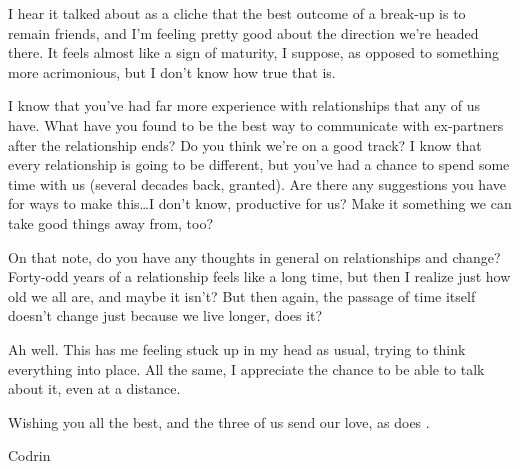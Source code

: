 I hear it talked about as a cliche that the best outcome of a break-up is to remain friends, and I'm feeling pretty good about the direction we're headed there. It feels almost like a sign of maturity, I suppose, as opposed to something more acrimonious, but I don't know how true that is.

I know that you've had far more experience with relationships that any of us have. What have you found to be the best way to communicate with ex-partners after the relationship ends? Do you think we're on a good track? I know that every relationship is going to be different, but you've had a chance to spend some time with us (several decades back, granted). Are there any suggestions you have for ways to make this\ldots{}I don't know, productive for us? Make it something we can take good things away from, too?

On that note, do you have any thoughts in general on relationships and change? Forty-odd years of a relationship feels like a long time, but then I realize just how old we all are, and maybe it isn't? But then again, the passage of time itself doesn't change just because we live longer, does it?

Ah well. This has me feeling stuck up in my head as usual, trying to think everything into place. All the same, I appreciate the chance to be able to talk about it, even at a distance.

Wishing you all the best, and the three of us send our love, as does \Partner .

Codrin
